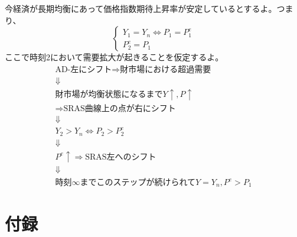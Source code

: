 \documentclass[a4paper, 12pt]{article}
\begin{document}
今経済が長期均衡にあって価格指数期待上昇率が安定しているとするよ。つまり、
\begin{displaymath}
  \left\{\begin{array}{c}
    Y_1=Y_n \Leftrightarrow P_1=P_1^e \\
    P_2^e=P_1
  \end{array}\right.
\end{displaymath}
ここで時刻2において需要拡大が起きることを仮定するよ。
\begin{displaymath}
  \begin{array}{c}
    \text{AD-左にシフト}\Rightarrow \text{財市場における超過需要}\\
    \Downarrow \\
    \text{財市場が均衡状態になるまで}Y\uparrow, P\uparrow \\
    \Rightarrow \text{SRAS曲線上の点が右にシフト}\\
    \Downarrow \\
    Y_2>Y_n \Leftrightarrow P_2>P_2^e \\
    \Downarrow \\
    P^e \uparrow \Rightarrow \text{SRAS左へのシフト}\\
    \Downarrow \\
    \text{時刻}\infty \text{までこのステップが続けられて}Y=Y_n, P^e>P_1
  \end{array}
\end{displaymath}
\newpage


\section{付録}
\end{document}
